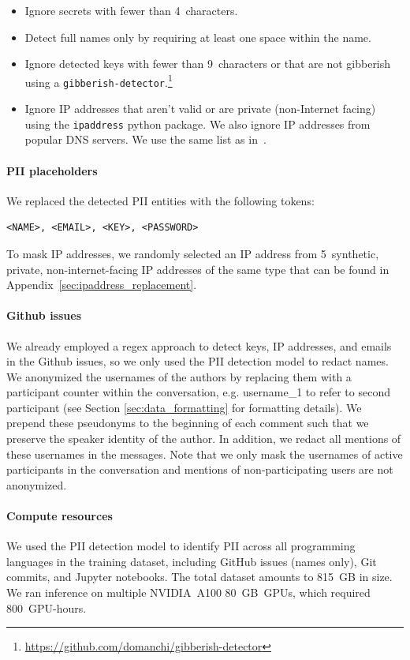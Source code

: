 \begin{itemize}
    \item Ignore secrets with fewer than 4~characters.
    \item Detect full names only by requiring at least one space within the name.
    \item Ignore detected keys with fewer than 9~characters or that are not gibberish using a \texttt{gibberish-detector}.\footnote{\url{https://github.com/domanchi/gibberish-detector}}
    \item Ignore IP addresses that aren't valid or are private (non-Internet facing) using the \texttt{ipaddress} python package. We also ignore IP addresses from popular DNS servers. We use the same list as in~\cite{allal2023santacoder}.
\end{itemize}

\paragraph{PII placeholders} We replaced the detected PII entities with the following tokens:

\begin{verbatim}
<NAME>, <EMAIL>, <KEY>, <PASSWORD>
\end{verbatim}

To mask IP addresses, we randomly selected an IP address from 5~synthetic, private, non-internet-facing IP addresses of the same type that can be found in Appendix~\ref{sec:ipaddress_replacement}.

\paragraph{Github issues} We already employed a regex approach to detect keys, IP addresses, and emails in the Github issues, so we only used the PII detection model to redact names. We anonymized the usernames of the authors by replacing them with a participant counter within the conversation,  e.g. username\_1 to refer to second participant (see Section \ref{sec:data_formatting} for formatting details). We prepend these pseudonyms to the beginning of each comment such that we preserve the speaker identity of the author. In addition, we redact all mentions of these usernames in the messages. Note that we only mask the usernames of active participants in the conversation and mentions of non-participating users are not anonymized. 

\paragraph{Compute resources} We used the PII detection model to identify PII across all programming languages in the training dataset, including GitHub issues (names only), Git commits, and Jupyter notebooks. The total dataset amounts to 815~GB in size. We ran inference on multiple NVIDIA~A100 80~GB~GPUs, which required 800~GPU-hours. 

